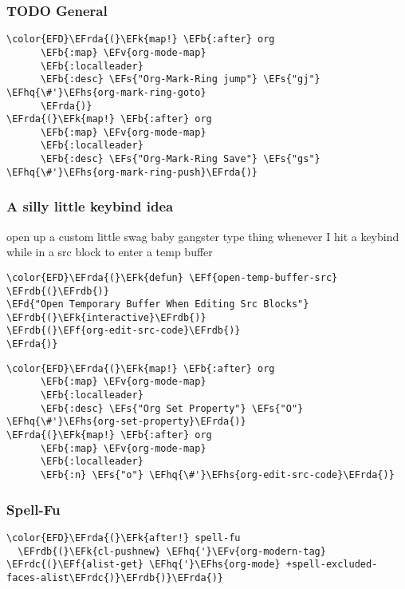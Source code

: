 \documentclass{article}
\newcommand{\EFs}[1]{\textcolor{EFs}{#1}} %
\newcommand{\EFd}[1]{\textcolor{EFd}{#1}} %
\newcommand{\EFk}[1]{\textcolor{EFk}{#1}} %
\newcommand{\EFb}[1]{\textcolor{EFb}{#1}} %
\newcommand{\EFf}[1]{\textcolor{EFf}{#1}} %
\newcommand{\EFv}[1]{\textcolor{EFv}{#1}} %
\newcommand{\EFhq}[1]{#1} %
\newcommand{\EFhs}[1]{\textcolor{EFhs}{#1}} %
\newcommand{\EFrda}[1]{\textcolor{EFrda}{#1}} %
\newcommand{\EFrdb}[1]{\textcolor{EFrdb}{#1}} %
\newcommand{\EFrdc}[1]{\textcolor{EFrdc}{#1}} %
\begin{document}
\subsubsection{{\bfseries\sffamily TODO} General}
\label{sec:orgbd55f1a}
\begin{Code}
\begin{Verbatim}
\color{EFD}\EFrda{(}\EFk{map!} \EFb{:after} org
      \EFb{:map} \EFv{org-mode-map}
      \EFb{:localleader}
      \EFb{:desc} \EFs{"Org-Mark-Ring jump"} \EFs{"gj"} \EFhq{\#'}\EFhs{org-mark-ring-goto}
      \EFrda{)}
\EFrda{(}\EFk{map!} \EFb{:after} org
      \EFb{:map} \EFv{org-mode-map}
      \EFb{:localleader}
      \EFb{:desc} \EFs{"Org-Mark-Ring Save"} \EFs{"gs"} \EFhq{\#'}\EFhs{org-mark-ring-push}\EFrda{)}
\end{Verbatim}
\end{Code}

\subsubsection{A silly little keybind idea}
\label{sec:org63938b7}
open up a custom little swag baby gangster type thing whenever I hit a keybind while in a src block to enter a temp buffer
\begin{Code}
\begin{Verbatim}
\color{EFD}\EFrda{(}\EFk{defun} \EFf{open-temp-buffer-src} \EFrdb{(}\EFrdb{)}
\EFd{"Open Temporary Buffer When Editing Src Blocks"}
\EFrdb{(}\EFk{interactive}\EFrdb{)}
\EFrdb{(}\EFf{org-edit-src-code}\EFrdb{)}
\EFrda{)}
\end{Verbatim}
\end{Code}



\begin{Code}
\begin{Verbatim}
\color{EFD}\EFrda{(}\EFk{map!} \EFb{:after} org
      \EFb{:map} \EFv{org-mode-map}
      \EFb{:localleader}
      \EFb{:desc} \EFs{"Org Set Property"} \EFs{"O"} \EFhq{\#'}\EFhs{org-set-property}\EFrda{)}
\EFrda{(}\EFk{map!} \EFb{:after} org
      \EFb{:map} \EFv{org-mode-map}
      \EFb{:localleader}
      \EFb{:n} \EFs{"o"} \EFhq{\#'}\EFhs{org-edit-src-code}\EFrda{)}
\end{Verbatim}
\end{Code}

\subsubsection{Spell-Fu}
\label{sec:org960632c}
\begin{Code}
\begin{Verbatim}
\color{EFD}\EFrda{(}\EFk{after!} spell-fu
  \EFrdb{(}\EFk{cl-pushnew} \EFhq{'}\EFv{org-modern-tag} \EFrdc{(}\EFf{alist-get} \EFhq{'}\EFhs{org-mode} +spell-excluded-faces-alist\EFrdc{)}\EFrdb{)}\EFrda{)}
\end{Verbatim}
\end{Code}
\end{document}

